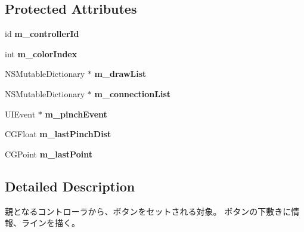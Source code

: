 \subsection*{Protected Attributes}
\begin{DoxyCompactItemize}
\item 
\hypertarget{interface_messenger_display_view_aa560737c094fbfbca64d1a52724a307e}{
id {\bfseries m\_\-controllerId}}
\label{interface_messenger_display_view_aa560737c094fbfbca64d1a52724a307e}

\item 
\hypertarget{interface_messenger_display_view_a9329c2b1bc22938abd84560c9a66c89d}{
int {\bfseries m\_\-colorIndex}}
\label{interface_messenger_display_view_a9329c2b1bc22938abd84560c9a66c89d}

\item 
\hypertarget{interface_messenger_display_view_a34409905c6603a9a5084c5248cb3fc2a}{
NSMutableDictionary $\ast$ {\bfseries m\_\-drawList}}
\label{interface_messenger_display_view_a34409905c6603a9a5084c5248cb3fc2a}

\item 
\hypertarget{interface_messenger_display_view_a0b6812fc7734e00008e374c06475511b}{
NSMutableDictionary $\ast$ {\bfseries m\_\-connectionList}}
\label{interface_messenger_display_view_a0b6812fc7734e00008e374c06475511b}

\item 
\hypertarget{interface_messenger_display_view_a1784971ff728fd49f87867555f0d13f9}{
UIEvent $\ast$ {\bfseries m\_\-pinchEvent}}
\label{interface_messenger_display_view_a1784971ff728fd49f87867555f0d13f9}

\item 
\hypertarget{interface_messenger_display_view_a6b0dad3517ee8881c3d4e50c3a130054}{
CGFloat {\bfseries m\_\-lastPinchDist}}
\label{interface_messenger_display_view_a6b0dad3517ee8881c3d4e50c3a130054}

\item 
\hypertarget{interface_messenger_display_view_a13352f8ffc249726f73fcce007df21d0}{
CGPoint {\bfseries m\_\-lastPoint}}
\label{interface_messenger_display_view_a13352f8ffc249726f73fcce007df21d0}

\end{DoxyCompactItemize}


\subsection{Detailed Description}
親となるコントローラから、ボタンをセットされる対象。 ボタンの下敷きに情報、ラインを描く。 


